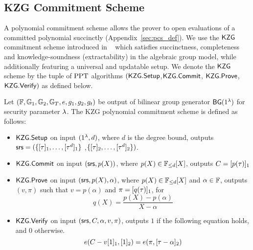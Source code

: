 \subsection{KZG Commitment Scheme}
\label{sec:KZG}
A polynomial commitment scheme allows the prover to open evaluations of a committed polynomial succinctly (Appendix~\ref{sec:pcs_def}).
We use the $\mathsf{KZG}$ commitment scheme introduced in ~\cite{AC:KatZavGol10} which satisfies succinctness, completeness and knowledge-soundness (extractability)
in the algebraic group model, while additionally featuring a universal and updatable setup. We denote the $\mathsf{KZG}$ scheme by the tuple of $\mathrm{PPT}$ algorithms $(\mathsf{KZG.Setup}$,$\mathsf{KZG.Commit}$, $\mathsf{KZG.Prove}$, $\mathsf{KZG.Verify})$ as defined below.
\begin{definition}
	Let $(\mathbb{F},\mathbb{G}_1,\mathbb{G}_2,\mathbb{G}_T, e, g_1, g_2, g_t)$ be output of bilinear group generator $\mathsf{BG}(1^{\lambda})$ for security parameter $\lambda$.
	The KZG polynomial commitment scheme is defined as follows:
	\begin{itemize}[leftmargin=1em]
		\item $\mathsf{KZG.Setup}$ on input $(1^{\lambda},d)$, where $d$ is the degree bound, outputs
		$\mathsf{srs} = (\{[\tau]_1,\ldots,[\tau^d]_1\}$ ,$\{[\tau]_2,\ldots,[\tau^d]_2\})$.
		\item $\mathsf{KZG.Commit}$ on input $(\mathsf{srs},p(X))$, where $p(X) \in \mathbb{F}_{\leq d}[X]$, outputs $C=[p(\tau)]_1$
		\item $\mathsf{KZG.Prove}$ on input $(\mathsf{srs},p(X),\alpha)$, where $p(X) \in \mathbb{F}_{\leq d}[X]$ and $\alpha\in \mathbb{F}$, outputs $(v, \pi)$ such that $v=p(\alpha)$ and $\pi=[q(\tau)]_1$, for
		\[ q(X)=\frac{p(X)-p(\alpha)}{X-\alpha} \]
		\item $\mathsf{KZG.Verify}$ on input $(\mathsf{srs},C,\alpha,v,\pi)$, outputs $1$ if the following equation holds, and $0$ otherwise.
		\[ e(C-v[1]_1, [1]_2) = e(\pi, [\tau-\alpha]_2) \]
	\end{itemize}
\end{definition}


